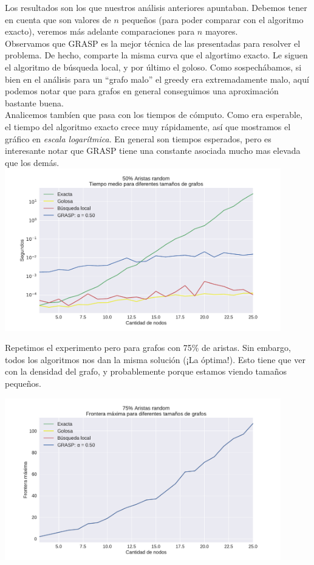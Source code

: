 Los resultados son los que nuestros análisis anteriores apuntaban. Debemos tener en cuenta que son valores de $n$ pequeños (para poder comparar con el algoritmo exacto), veremos más adelante comparaciones para $n$ mayores. \\

Observamos que GRASP es la mejor técnica de las presentadas para resolver el problema. De hecho, comparte la misma curva que el algortimo exacto. Le siguen el algoritmo de búsqueda local, y por último el goloso. Como sospechábamos, si bien en el análisis para un ``grafo malo'' el greedy era extremadamente malo, aquí podemos notar que para grafos en general conseguimos una aproximación bastante buena. \\

Analicemos tambíen que pasa con los tiempos de cómputo. Como era esperable, el tiempo del algoritmo exacto crece muy rápidamente, así que mostramos el gráfico en \textit{escala logarítmica}. En general son tiempos esperados, pero es interesante notar que GRASP tiene una constante asociada mucho mas elevada que los demás. \\

{\centering
    \includegraphics[width=0.9\textwidth]{informe/imgs/exp_random50_tiempo_todos_v2.pdf}
}
$ $ \newline

Repetimos el experimento pero para grafos con 75\% de aristas. Sin embargo, todos los algoritmos nos dan la misma solución (¡La óptima!). Esto tiene que ver con la densidad del grafo, y probablemente porque estamos viendo tamaños pequeños. \\

{\centering
    \includegraphics[width=0.9\textwidth]{informe/imgs/exp_random75_frontera_todos_v2.pdf}
    
}
$ $ \newline

